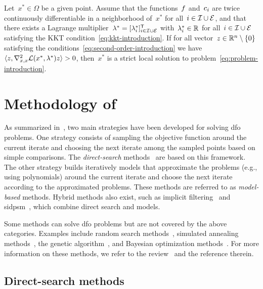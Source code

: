 \begin{theorem}
    \label{thm:second-order-sufficient-conditions}
    Let~$x^{\ast} \in \Omega$ be a given point.
    Assume that the functions~$f$ and~$c_{i}$ are twice continuously differentiable in a neighborhood of~$x^{\ast}$ for all~$i \in \mathcal{I} \cup \mathcal{E}$, and that there exists a Lagrange multiplier~$\lambda^{\ast} = [\lambda_i^{\ast}]_{i \in \mathcal{I} \cup \mathcal{E}}^{\mathsf{T}}$ with~$\lambda_i^{\ast} \in \mathbb{R}$ for all~$i \in \mathcal{I} \cup \mathcal{E}$ satisfying the KKT condition~\cref{eq:kkt-introduction}.
    If for all vector~$z \in \mathbb{R}^n \setminus \{0\}$ satisfying the conditions~\cref{eq:second-order-introduction} we have~$\inner{z, \nabla_{x, x}^2 \lag(x^{\ast}, \lambda^{\ast}) z} > 0$, then~$x^{\ast}$ is a strict local solution to problem~\cref{eq:problem-introduction}.
\end{theorem}

\section{Methodology of }

As summarized in~\cite{Conn_Scheinberg_Vicente_2009b}, two main strategies have been developed for solving \gls{dfo} problems.
One strategy consists of sampling the objective function around the current iterate and choosing the next iterate among the sampled points based on simple comparisons.
The \emph{direct-search} methods~\cite{Kolda_Lewis_Torczon_2003} are based on this framework.
The other strategy builds iteratively models that approximate the problems (e.g., using polynomials) around the current iterate and choose the next iterate according to the approximated problems.
These methods are referred to as \emph{model-based} methods.
Hybrid methods also exist, such as implicit filtering~\cite{Kelley_2011} and \gls{sidpsm}~\cite{Custodio_Rocha_Vicente_2009}, which combine direct search and models.

Some methods can solve \gls{dfo} problems but are not covered by the above categories.
Examples include random search methods~\cite{Zhigljavsky_1991}, simulated annealing methods~\cite{Kirkpatrick_Gelatt_Vecchi_1983}, the genetic algorithm~\cite{Jong_1975,Holland_1975}, and Bayesian optimization methods~\cite{Mockus_1975,Shahriari_Etal_2016}.
For more information on these methods, we refer to the review~\cite{Larson_Menickelly_Wild_2019} and the reference therein.

\subsection{Direct-search methods}

